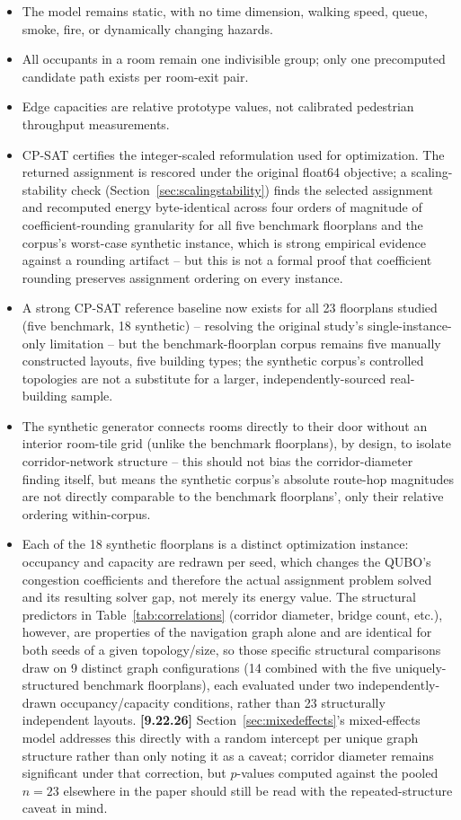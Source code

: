 \documentclass[11pt]{article}
\begin{document}
\begin{itemize}[leftmargin=*]
\item The model remains static, with no time dimension, walking speed, queue, smoke, fire, or dynamically changing hazards.
\item All occupants in a room remain one indivisible group; only one precomputed candidate path exists per room-exit pair.
\item Edge capacities are relative prototype values, not calibrated pedestrian throughput measurements.
\item CP-SAT certifies the integer-scaled reformulation used for optimization. The returned assignment is rescored under the original float64 objective; a scaling-stability check (Section~\ref{sec:scalingstability}) finds the selected assignment and recomputed energy byte-identical across four orders of magnitude of coefficient-rounding granularity for all five benchmark floorplans and the corpus's worst-case synthetic instance, which is strong empirical evidence against a rounding artifact -- but this is not a formal proof that coefficient rounding preserves assignment ordering on every instance.
\item A strong CP-SAT reference baseline now exists for all 23 floorplans studied (five benchmark, 18 synthetic) -- resolving the original study's single-instance-only limitation -- but the benchmark-floorplan corpus remains five manually constructed layouts, five building types; the synthetic corpus's controlled topologies are not a substitute for a larger, independently-sourced real-building sample.
\item The synthetic generator connects rooms directly to their door without an interior room-tile grid (unlike the benchmark floorplans), by design, to isolate corridor-network structure -- this should not bias the corridor-diameter finding itself, but means the synthetic corpus's absolute route-hop magnitudes are not directly comparable to the benchmark floorplans', only their relative ordering within-corpus.
\item Each of the 18 synthetic floorplans is a distinct optimization instance: occupancy and capacity are redrawn per seed, which changes the QUBO's congestion coefficients and therefore the actual assignment problem solved and its resulting solver gap, not merely its energy value. The structural predictors in Table~\ref{tab:correlations} (corridor diameter, bridge count, etc.), however, are properties of the navigation graph alone and are identical for both seeds of a given topology/size, so those specific structural comparisons draw on 9 distinct graph configurations (14 combined with the five uniquely-structured benchmark floorplans), each evaluated under two independently-drawn occupancy/capacity conditions, rather than 23 structurally independent layouts. \textbf{[9.22.26]} Section~\ref{sec:mixedeffects}'s mixed-effects model addresses this directly with a random intercept per unique graph structure rather than only noting it as a caveat; corridor diameter remains significant under that correction, but $p$-values computed against the pooled $n=23$ elsewhere in the paper should still be read with the repeated-structure caveat in mind.

\end{itemize}
\end{document}
